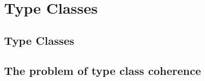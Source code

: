 \chapter{Type Classes}\label{ch:typeclasses}

\section{Type Classes}

\section{The problem of type class coherence}


